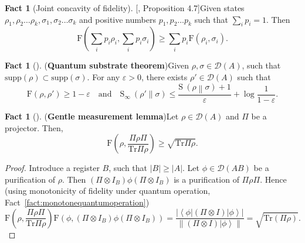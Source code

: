 \documentclass[11pt,a4paper]{article}
\def\F{\mathrn{F}}
\theoremstyle{plain}
\theoremstyle{definition}
\newtheorem{fact}[theorem]{Fact}
\newcommand {\br} [1] {\ensuremath{ \left( #1 \right) }}
\newcommand {\minusspace} {\: \! \!}
\newcommand {\fn} [2] {\ensuremath{ #1 \minusspace \br{ #2 } }}
\newcommand {\abs} [1] {\ensuremath{ \left| #1 \right| }}
\newcommand {\norm} [1] {\ensuremath{ \left\| #1 \right\| }}
\newcommand {\relent} [2] {\fn{\mathrm{S}}{#1 \middle\| #2}}
\newcommand {\rminent} [2] {\fn{\mathrm{S}_{\infty}}{#1 \middle\| #2}}
\newcommand {\bra} [1] {\ensuremath{ \left\langle #1 \right| }}
\newcommand {\ket} [1] {\ensuremath{ \left| #1 \right\rangle }}
\newcommand {\Tr} {\ensuremath{ \mathrm{Tr} }}
\newcommand {\myqedhere} {\tag*{\qedhere}}
\def\ve{{\varepsilon}}
\def\F{\mathrm{F}}
\begin{document}

\begin{fact}[Joint concavity of fidelity][\cite{Watrouslecturenote}, Proposition 4.7]\label{fact:fidconcave}
Given states $\rho_1,\rho_2\ldots\rho_k,\sigma_1,\sigma_2\ldots\sigma_k$ and positive numbers $p_1,p_2\ldots p_k$ such that $\sum_ip_i=1$. Then $$\F(\sum_ip_i\rho_i,\sum_ip_i\sigma_i)\geq \sum_ip_i\F(\rho_i,\sigma_i).$$
\end{fact}

\begin{fact}[\cite{JainRS09,JainNayak:2012}](\textbf{Quantum substrate theorem})\label{fact:substrate}
Given $\rho, \sigma \in \mathcal{D}(A)$, such that $\text{supp}(\rho) \subset \text{supp}(\sigma)$. For any $\ve>0$, there exists $\rho'\in \mathcal{D}(A)$ such that
\[\F(\rho,\rho')\geq1-\ve\quad \mbox{and}\quad \rminent{\rho'}{\sigma}\leq\frac{\relent{\rho}{\sigma}+1}{\ve}+\log\frac{1}{1-\ve}.\]
\end{fact}

\begin{fact}[\cite{Winter:1999,Ogawa:2002}](\textbf{Gentle measurement lemma})\label{fact:gentlemeasurement}
Let $\rho\in \mathcal{D}(A)$  and $\Pi$ be a projector. Then,
\[\F(\rho,\frac{\Pi \rho \Pi}{\Tr \Pi \rho })\geq \sqrt{\Tr \Pi \rho}.\]
\end{fact}
\begin{proof}
Introduce a register $B$, such that $|B|\geq |A|$. Let $\phi\in \mathcal{D}(AB)$ be a purification of $\rho$. Then $( \Pi \otimes I_B)\phi ( \Pi \otimes I_B)$ is a purification of $\Pi \rho \Pi $. Hence  (using monotonicity of fidelity under quantum operation, Fact~\ref{fact:monotonequantumoperation})
\[\F(\rho, \frac{\Pi \rho \Pi}{\Tr \Pi \rho } )\F\br{\phi,(\Pi\otimes I_B)\phi(\Pi\otimes I_B)}= \frac{\abs{\bra{\phi}(\Pi \otimes I) \ket{\phi}}}{\norm{(\Pi \otimes I) \ket{\phi}}}  = \sqrt{\Tr( \Pi \rho)}.   \myqedhere \] 
\end{proof}
\end{document}
